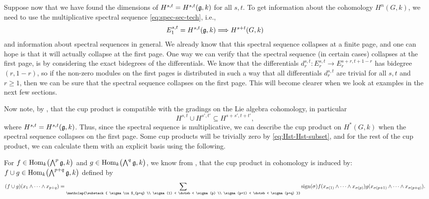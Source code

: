 Suppose now that we have found the dimensions of $H^{s,t} = H^{s,t}(\mathfrak{g},k)$ for all $s,t$. To get information about the cohomology $H^{n}(G,k)$, we need to use the multiplicative spectral sequence \eqref{eq:spec-sec-tech}, i.e.,
\begin{equation*}
  E_{1}^{s,t} = H^{s,t}(\mathfrak{g}, k) \Longrightarrow H^{s+t}(G,k)
\end{equation*}
and information about spectral sequences in general. We already know that this spectral sequence collapses at a finite page, and one can hope is that it will actually collapse at the first page. One way we can verify that the spectral sequence (in certain cases) collapses at the first page, is by considering the exact bidegrees of the differentials. We know that the differentials $d_{r}^{s,t} \colon E_{r}^{s,t} \to E_{r}^{s+r,t+1-r}$ has bidegree $(r,1-r)$, so if the non-zero modules on the first pages is distributed in such a way that all differentials $d_{r}^{s,t}$ are trivial for all $s,t$ and $r\geq1$, then we can be sure that the spectral sequence collapses on the first page. This will become clearer when we look at examples in the next few sections.

Now note, by \cite[§3.7]{Fuks}, that the cup product is compatible with the gradings on the Lie algebra cohomology, in particular
\begin{equation}
H^{s,t} \cup H^{s',t'} \subseteq H^{s+s',t+t'},\label{eq:Hst-Hst-subset}
\end{equation}
where $H^{s,t} = H^{s,t}(\mathfrak{g},k)$. Thus, since the spectral sequence is multiplicative, we can describe the cup product on $H^{*}(G,k)$ when the spectral sequence collapses on the first page. Some cup products will be trivially zero by \eqref{eq:Hst-Hst-subset}, and for the rest of the cup product, we can calculate them with an explicit basis using the following.

For $f \in \operatorname{Hom}_{k}\bigl( \bigwedge^{p}\mathfrak{g}, k \bigr)$ and $g \in \operatorname{Hom}_{k}\bigl( \bigwedge^{q}\mathfrak{g}, k \bigr)$, we know from \cite[Chap.~XIII, Sect.~8]{CartanHomAlg}, that the cup product in cohomology is induced by: $f \cup g \in \operatorname{Hom}_{k}\bigl( \bigwedge^{p+q}\mathfrak{g}, k \bigr)$ defined by
\begin{equation}
  \label{eq:cup-prod-def}
  (f \cup g)(x_{1} \wedge \dotsb \wedge x_{p+q})  = \sum_{\mathclap{\substack{ \sigma \in S_{p+q} \\ \sigma(1) < \dotsb < \sigma(p) \\ \sigma(p+1) < \dotsb < \sigma(p+q) }}} \sign(\sigma) f(x_{\sigma(1)} \wedge \dotsb \wedge x_{\sigma(p)}) g(x_{\sigma(p+1)} \wedge \dotsb \wedge x_{\sigma(p+q)}).
\end{equation}

